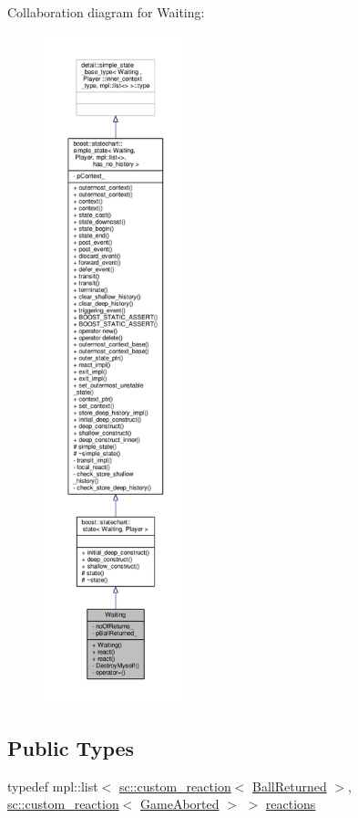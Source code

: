 Collaboration diagram for Waiting\+:
\nopagebreak
\begin{figure}[H]
\begin{center}
\leavevmode
\includegraphics[height=550pt]{struct_waiting__coll__graph}
\end{center}
\end{figure}
\subsection*{Public Types}
\begin{DoxyCompactItemize}
\item 
typedef mpl\+::list$<$ \mbox{\hyperlink{classboost_1_1statechart_1_1custom__reaction}{sc\+::custom\+\_\+reaction}}$<$ \mbox{\hyperlink{struct_ball_returned}{Ball\+Returned}} $>$, \mbox{\hyperlink{classboost_1_1statechart_1_1custom__reaction}{sc\+::custom\+\_\+reaction}}$<$ \mbox{\hyperlink{struct_game_aborted}{Game\+Aborted}} $>$ $>$ \mbox{\hyperlink{struct_waiting_a81771f42c7fd4098798766c8586bd164}{reactions}}
\end{DoxyCompactItemize}
